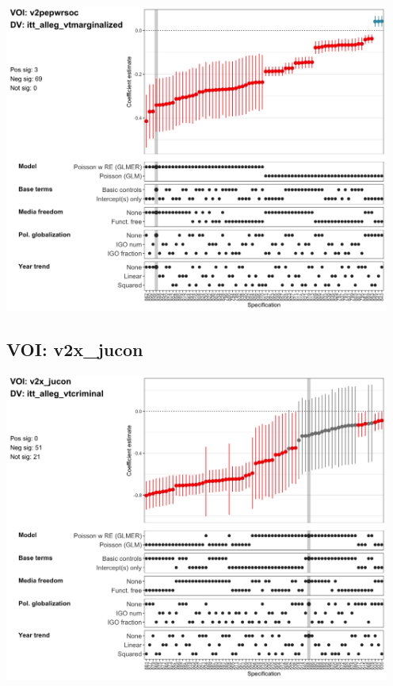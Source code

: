 \documentclass[]{article}
\begin{document}
\includegraphics[height=4in]{../output/figures-robustness/specplot-v2pepwrsoc-itt_alleg_vtmarginalized.png}

\hypertarget{voi-v2x_jucon}{%
\subsection{VOI: v2x\_jucon}\label{voi-v2x_jucon}}

\includegraphics[height=4in]{../output/figures-robustness/specplot-v2x_jucon-itt_alleg_vtcriminal.png}
\end{document}
